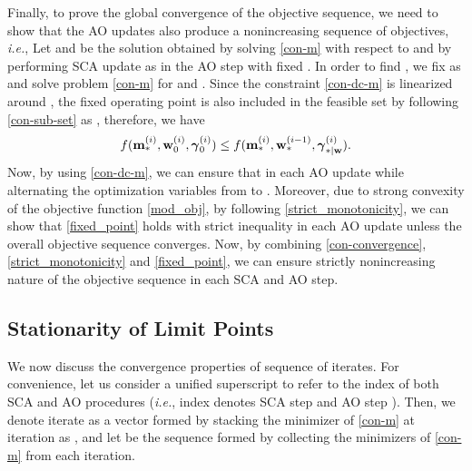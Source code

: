 Finally, to prove the global convergence of the objective sequence, we need to show that the \ac{AO} updates also produce a nonincreasing sequence of objectives, \textit{i.e.}, 
\iftoggle{single_column}{
\begin{equation}
f(\iter{\mx}{\lpoint}{i},\iter{\my}{0}{i},\iter{\mz}{0}{i}) \leq f(\iter{\mx}{\lpoint}{i},\iter{\my}{\lpoint}{i-1},\iter{\mz}{\lpoint|\my}{i}).
\end{equation}}{
\begin{equation}
f(\iter{\mx}{\lpoint}{i},\iter{\my}{0}{i},\iter{\mz}{0}{i}) \leq f(\iter{\mx}{\lpoint}{i},\iter{\my}{\lpoint}{i-1},\iter{\mz}{\lpoint|\my}{i}).
\end{equation}}
Let  and  be the solution obtained by solving \eqref{con-m} with respect to \eqn{\mx} and \eqn{\mz} by performing \ac{SCA} update as  in the  \ac{AO} step with fixed . In order to find , we fix \eqn{\mx} as  and solve problem \eqref{con-m} for \me{\my} and \eqn{\mz}. Since the constraint \eqref{con-dc-m} is linearized around , the fixed operating point is also included in the feasible set by following \eqref{con-sub-set} as , therefore, we have
\begin{equation} \label{fixed_point}
f(\iter{\mx}{\lpoint}{i},\iter{\my}{0}{i},\iter{\mz}{0}{i}) \leq f(\iter{\mx}{\lpoint}{i},\iter{\my}{\lpoint}{i-1},\iter{\mz}{\lpoint|\my}{i}).
\end{equation}
Now, by using \eqref{con-dc-m}, we can ensure that  in each \ac{AO} update  while alternating the optimization variables from \eqn{\mx,\mz} to \eqn{\my,\mz}. Moreover, due to strong convexity of the objective function \eqref{mod_obj}, by following \eqref{strict_monotonicity}, we can show that \eqref{fixed_point} holds with strict inequality in each \ac{AO} update unless the overall objective sequence converges. Now, by combining \eqref{con-convergence}, \eqref{strict_monotonicity} and \eqref{fixed_point}, we can ensure strictly nonincreasing nature of the objective sequence  in each \ac{SCA} and \ac{AO} step.

\subsection{Stationarity of Limit Points} \label{c-b}
We now discuss the convergence properties of sequence of iterates. For convenience, let us consider a unified superscript  to refer to the index of both \ac{SCA} and \ac{AO} procedures (\textit{i.e.}, index  denotes \ac{SCA} step  and \ac{AO} step ). Then, we denote iterate  as a vector formed by stacking the minimizer of \eqref{con-m} at iteration  as , and let  be the sequence formed by collecting the minimizers of \eqref{con-m} from each iteration.

